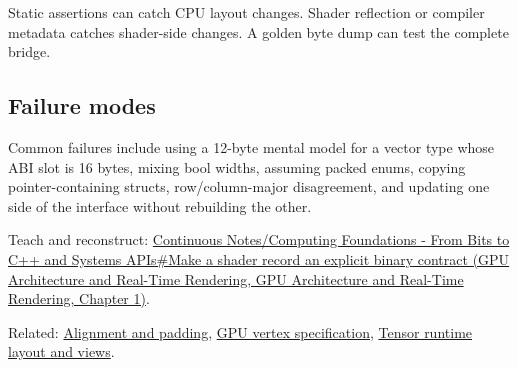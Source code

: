 Static assertions can catch CPU layout changes. Shader reflection or compiler metadata catches shader-side changes. A golden byte dump can test the complete bridge.

\subsection{Failure modes}\label{appendix-749048795dbb-failure-modes}

Common failures include using a 12-byte mental model for a vector type whose ABI slot is 16 bytes, mixing bool widths, assuming packed enums, copying pointer-containing structs, row/column-major disagreement, and updating one side of the interface without rebuilding the other.

Teach and reconstruct: \href{../06-GPU-Architecture-and-Real-Time-Rendering/main.pdf\#nameddest=01-foundations-i-ch008-make-a-shader-record-an-explicit-binary-contract}{Continuous Notes/Computing Foundations - From Bits to C++ and Systems APIs\#Make a shader record an explicit binary contract (GPU Architecture and Real-Time Rendering, GPU Architecture and Real-Time Rendering, Chapter 1)}.

Related: \hyperref[appendix-a1f7c53b4742]{Alignment and padding}, \hyperref[appendix-749ba51a6c25]{GPU vertex specification}, \hyperref[appendix-cebadf3106d1]{Tensor runtime layout and views}.
